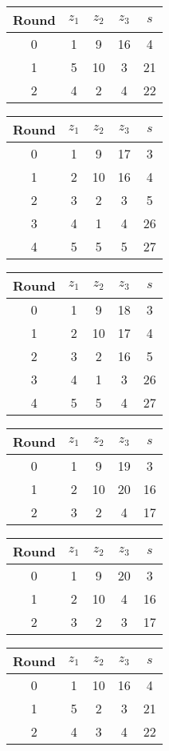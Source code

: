 \begin{multicols}{2}
\begin{tabular}{c | c | c | c | c }
Round & $z_1$ & $z_2$ & $z_3$ & $s$ \\
\hline
0 & 1 & 9 & 16 & 4 \\
1 & 5 & 10 & 3 & 21 \\
2 & 4 & 2 & 4 & 22
\end{tabular}


\begin{tabular}{c | c | c | c | c }
Round & $z_1$ & $z_2$ & $z_3$ & $s$ \\
\hline
0 & 1 & 9 & 17 & 3 \\
1 & 2 & 10 & 16 & 4 \\
2 & 3 & 2 & 3 & 5 \\
3 & 4 & 1 & 4 & 26 \\
4 & 5 & 5 & 5 & 27
\end{tabular}


\begin{tabular}{c | c | c | c | c }
Round & $z_1$ & $z_2$ & $z_3$ & $s$ \\
\hline
0 & 1 & 9 & 18 & 3 \\
1 & 2 & 10 & 17 & 4 \\
2 & 3 & 2 & 16 & 5 \\
3 & 4 & 1 & 3 & 26 \\
4 & 5 & 5 & 4 & 27
\end{tabular}


\begin{tabular}{c | c | c | c | c }
Round & $z_1$ & $z_2$ & $z_3$ & $s$ \\
\hline
0 & 1 & 9 & 19 & 3 \\
1 & 2 & 10 & 20 & 16 \\
2 & 3 & 2 & 4 & 17
\end{tabular}


\begin{tabular}{c | c | c | c | c }
Round & $z_1$ & $z_2$ & $z_3$ & $s$ \\
\hline
0 & 1 & 9 & 20 & 3 \\
1 & 2 & 10 & 4 & 16 \\
2 & 3 & 2 & 3 & 17
\end{tabular}

\begin{tabular}{c | c | c | c | c }
Round & $z_1$ & $z_2$ & $z_3$ & $s$ \\
\hline
0 & 1 & 10 & 16 & 4 \\
1 & 5 & 2 & 3 & 21 \\
2 & 4 & 3 & 4 & 22
\end{tabular}


\end{multicols}
